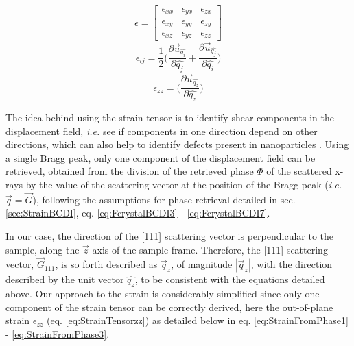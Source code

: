 {\begin{multicols}{3}
    \begin{equation}
        \epsilon =
        \begin{bmatrix}
            \epsilon_{xx} & \epsilon_{yx} & \epsilon_{zx}\\
            \epsilon_{xy} & \epsilon_{yy} & \epsilon_{zy}\\
            \epsilon_{xz} & \epsilon_{yz} & \epsilon_{zz}
        \end{bmatrix}
        \label{eq:StrainTensor}
    \end{equation}
    \break
    \begin{equation}
      \epsilon_{ij} = \frac{1}{2}
        \Bigg(
        \frac{\partial \vec{u}_{\hat{q_i}}}{\partial \hat{q_j}}
        +
        \frac{\partial \vec{u}_{\hat{q_j}}}{\partial \hat{q_i}}
        \Bigg)
        \label{eq:StrainTensorIJ}
    \end{equation}
    \break
    \begin{equation}
      \epsilon_{zz} =
        \Bigg(
        \frac{\partial \vec{u}_{\hat{q_z}}}{\partial \hat{q_z}}
        \Bigg)
        \label{eq:StrainTensorzz}
    \end{equation}
\end{multicols}

The idea behind using the strain tensor is to identify shear components in the displacement field, \textit{i.e.} see if components in one direction depend on other directions, which can also help to identify defects present in nanoparticles \parencite{Lauraux2021}.
Using a single Bragg peak, only one component of the displacement field can be retrieved, obtained from the division of the retrieved phase $\Phi$ of the scattered x-rays by the value of the scattering vector at the position of the Bragg peak (\textit{i.e.} $\vec{q} = \vec{G}$), following the assumptions for phase retrieval detailed in sec. \ref{sec:StrainBCDI}, eq. \ref{eq:FcrystalBCDI3} - \ref{eq:FcrystalBCDI7}.

In our case, the direction of the [111] scattering vector is perpendicular to the sample, along the $\vec{z}$ axis of the sample frame.
Therefore, the [111] scattering vector, $\vec{G}_{111}$, is so forth described as $\vec{q}_z$, of magnitude  $|\vec{q}_z|$, with the direction described by the unit vector  $\hat{q_z}$, to be consistent with the equations detailed above.
Our approach to the strain is considerably simplified since only one component of the strain tensor can be correctly derived, here the out-of-plane strain $\epsilon_{zz}$ (eq. \ref{eq:StrainTensorzz}) as detailed below in eq. \ref{eq:StrainFromPhase1} - \ref{eq:StrainFromPhase3}.

}
